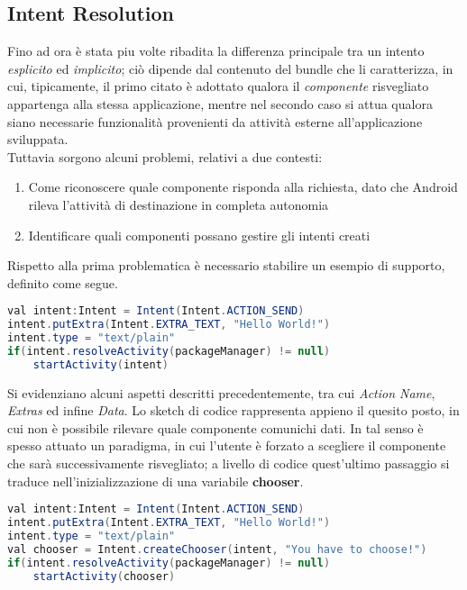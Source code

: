 \documentclass{article}
\begin{document}
\subsection*{Intent Resolution}
Fino ad ora è stata piu volte ribadita la differenza principale tra un intento \textit{esplicito} ed \textit{implicito}; ciò dipende dal contenuto del bundle che li caratterizza, in cui, tipicamente, il primo citato è adottato qualora il \textit{componente} risvegliato appartenga alla stessa applicazione, mentre nel secondo caso si attua qualora siano necessarie funzionalità provenienti da attività esterne all'applicazione sviluppata.\vspace*{7pt}\\
Tuttavia sorgono alcuni problemi, relativi a due contesti:
\begin{enumerate}
    \itemsep0em
    \renewcommand{\labelenumi}{-}
    \item Come riconoscere quale componente risponda alla richiesta, dato che Android rileva l'attività di destinazione in completa autonomia
    \item Identificare quali componenti possano gestire gli intenti creati
\end{enumerate}
Rispetto alla prima problematica è necessario stabilire un esempio di supporto, definito come segue.
\begin{lstlisting}[language=JAVA, title=Esempio di creazione di un intent implicito]
val intent:Intent = Intent(Intent.ACTION_SEND)
intent.putExtra(Intent.EXTRA_TEXT, "Hello World!")
intent.type = "text/plain"
if(intent.resolveActivity(packageManager) != null) 
    startActivity(intent)

\end{lstlisting}
Si evidenziano alcuni aspetti descritti precedentemente, tra cui \textit{Action Name}, \textit{Extras} ed infine \textit{Data}. Lo sketch di codice rappresenta appieno il quesito posto, in cui non è possibile rilevare quale componente comunichi dati. In tal senso è spesso attuato un paradigma, in cui l'utente è forzato a scegliere il componente che sarà successivamente risvegliato; a livello di codice quest'ultimo passaggio si traduce nell'inizializzazione di una variabile \textbf{chooser}.
\begin{lstlisting}[language=JAVA, title=Inserimento dell'elemento chooser]
val intent:Intent = Intent(Intent.ACTION_SEND)
intent.putExtra(Intent.EXTRA_TEXT, "Hello World!")
intent.type = "text/plain"
val chooser = Intent.createChooser(intent, "You have to choose!")
if(intent.resolveActivity(packageManager) != null) 
    startActivity(chooser)
\end{lstlisting}
\end{document}

